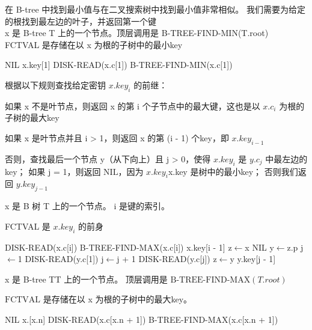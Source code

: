\documentclass[a4paper, justified]{tufte-handout}
\begin{document}
\begin{solution}
  在 B-tree 中找到最小值与在二叉搜索树中找到最小值非常相似。 我们需要为给定的根找到最左边的叶子，并返回第一个键\\
  x 是 B-tree T 上的一个节点。顶层调用是 B-TREE-FIND-MIN(T.root)\\
  FCTVAL 是存储在以 x 为根的子树中的最小key
  \begin{algorithm}
    \begin{algorithmic}[1]
      \Return NIL
      \Return x.key[1]
      \Else
      \State DISK-READ(x.c[1])
      \Return B-TREE-FIND-MIN(x.c[1])
      \EndIf
      \EndProcedure
    \end{algorithmic}
  \end{algorithm}
  根据以下规则查找给定密钥 $x.key_i$ 的前继：

  如果 x 不是叶节点，则返回 x 的第 i 个子节点中的最大键，这也是以 $x.c_i$ 为根的子树的最大key

  如果 x 是叶节点并且 i > 1，则返回 x 的第 (i - 1) 个key，即 $x.key_{i - 1}$

  否则，查找最后一个节点 y（从下向上）且 j > 0，使得 $x.key_i$ 是 $y.c_j$ 中最左边的key； 如果 j = 1，则返回 $\text{NIL}$，因为 $x.key_i$x.key 是树中的最小key； 否则我们返回 $y.key_{j - 1}$

  x 是 B 树 T 上的一个节点。 i 是键的索引。

  FCTVAL 是 $x.key_i$ 的前身

  \begin{algorithm}
    \begin{algorithmic}[2]
      \State DISK-READ(x.c[i])
      \Return B-TREE-FIND-MAX(x.c[i])
      \Return x.key[i - 1]
      \Else
      \State z$\gets$x
      \Return NIL
      \EndIf
      \State y$\gets$z.p
      \State j$\gets$1
      \State DISK-READ(y.c[1])
      \State j$\gets$j + 1
      \State DISK-READ(y.c[j])
      \EndWhile
      \State z$\gets$y
      \Else
      \Return y.key[j - 1]
      \EndIf
      \EndWhile
      \EndIf
      \EndProcedure
    \end{algorithmic}
  \end{algorithm}

  x 是 B-tree TT 上的一个节点。 顶层调用是 $\text{B-TREE-FIND-MAX}(T.root)$

  $\text{FCTVAL}$ 是存储在以 x 为根的子树中的最大key。\\
  \begin{algorithm}
    \begin{algorithmic}[3]
      \Return NIL
      \Return x.[x.n]
      \Else
      \State DISK-READ(x.c[x.n + 1])
      \Return B-TREE-FIND-MAX(x.c[x.n + 1])
      \EndIf
      \EndProcedure
    \end{algorithmic}
  \end{algorithm}
\end{solution}
\end{document}

